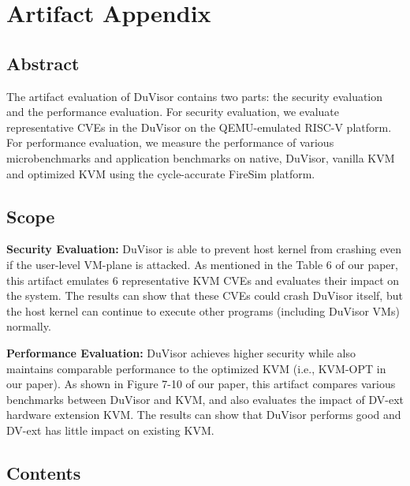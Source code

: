 \documentclass{article}
\begin{document}

\appendix
\section{Artifact Appendix}

\subsection*{Abstract}


The artifact evaluation of DuVisor contains two parts: the security evaluation and the performance evaluation.
For security evaluation, we evaluate representative CVEs in the DuVisor on the QEMU-emulated RISC-V platform.
For performance evaluation, we measure the performance of various microbenchmarks and application benchmarks on native, DuVisor, vanilla KVM and optimized KVM using the cycle-accurate FireSim platform.

\subsection*{Scope}


\noindent\textbf{Security Evaluation:} DuVisor is able to prevent host kernel from crashing even if the user-level VM-plane is attacked. As mentioned in the Table 6 of our paper, this artifact emulates 6 representative KVM CVEs and evaluates their impact on the system. The results can show that these CVEs could crash DuVisor itself, but the host kernel can continue to execute other programs (including DuVisor VMs) normally.

\noindent\textbf{Performance Evaluation:} DuVisor achieves higher security while also maintains comparable performance to the optimized KVM (i.e., KVM-OPT in our paper). As shown in Figure 7-10 of our paper, this artifact compares various benchmarks between DuVisor and KVM, and also evaluates the impact of DV-ext hardware extension KVM. The results can show that DuVisor performs good and DV-ext has little impact on existing KVM.

\subsection*{Contents}
\end{document}
